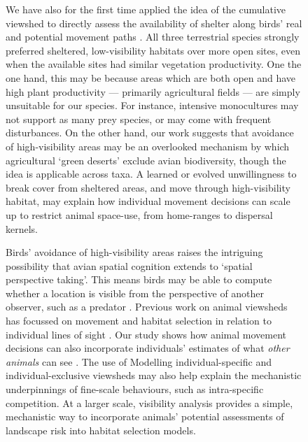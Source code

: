 \begin{figure}[!h]
We have also for the first time applied the idea of the cumulative viewshed to directly assess the availability of shelter along birds' real and potential movement paths \cite{olsoy2015}.
All three terrestrial species strongly preferred sheltered, low-visibility habitats over more open sites, even when the available sites had similar vegetation productivity.
One the one hand, this may be because areas which are both open and have high plant productivity --- primarily agricultural fields --- are simply unsuitable for our species.
For instance, intensive monocultures may not support as many prey species, or may come with frequent disturbances.
On the other hand, our work suggests that avoidance of high-visibility areas may be an overlooked mechanism by which agricultural `green deserts' exclude avian biodiversity, though the idea is applicable across taxa.
A learned or evolved unwillingness to break cover from sheltered areas, and move through high-visibility habitat, may explain how individual movement decisions can scale up to restrict animal space-use, from home-ranges to dispersal kernels.

Birds' avoidance of high-visibility areas raises the intriguing possibility that avian spatial cognition extends to `spatial perspective taking'.
This means birds may be able to compute whether a location is visible from the perspective of another observer, such as a predator \cite{olsoy2015}.
Previous work on animal viewsheds has focussed on movement and habitat selection in relation to individual lines of sight \cite{krams2001,aben2021}.
Our study shows how animal movement decisions can also incorporate individuals' estimates of what \textit{other animals} can see \cite{kopp1998}.
The use of 
Modelling individual-specific and individual-exclusive viewsheds may also help explain the mechanistic underpinnings of fine-scale behaviours, such as intra-specific competition.
At a larger scale, visibility analysis provides a simple, mechanistic way to incorporate animals' potential assessments of landscape risk into habitat selection models.




\end{figure}
